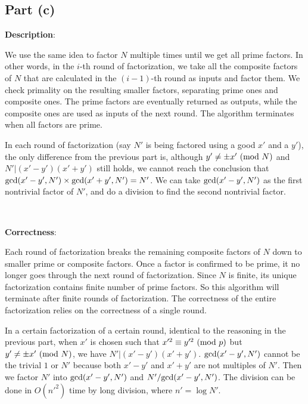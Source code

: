 \documentclass{article}
\begin{document}

\subsection{Part (c)}
\noindent\textbf{Description}:

We use the same idea to factor $N$ multiple times until we get all prime factors. In other words, in the $i$-th round of factorization, we take all the composite factors of $N$ that are calculated in the $(i-1)$-th round as inputs and factor them. We check primality on the resulting smaller factors, separating prime ones and composite ones. The prime factors are eventually returned as outputs, while the composite ones are used as inputs of the next round. The algorithm terminates when all factors are prime.

In each round of factorization (say $N'$ is being factored using a good $x'$ and a $y'$), the only difference from the previous part is, although $y'\neq\pm x'\textup{ (mod }N)$ and $N'|(x'-y')(x'+y')$ still holds, we cannot reach the conclusion that $\textup{gcd}(x'-y',N')\times\textup{gcd}(x'+y',N')=N'$. We can take $\textup{gcd}(x'-y',N')$ as the first nontrivial factor of $N'$, and do a division to find the second nontrivial factor.

~

\noindent\textbf{Correctness}:

Each round of factorization breaks the remaining composite factors of $N$ down to smaller prime or composite factors. Once a factor is confirmed to be prime, it no longer goes through the next round of factorization. Since $N$ is finite, its unique factorization contains finite number of prime factors. So this algorithm will terminate after finite rounds of factorization. The correctness of the entire factorization relies on the correctness of a single round.

In a certain factorization of a certain round, identical to the reasoning in the previous part, when $x'$ is chosen such that $x'^2\equiv y'^2\textup{ (mod }p)$ but $y'\neq\pm x'\textup{ (mod }N)$, we have $N'|(x'-y')(x'+y')$. $\textup{gcd}(x'-y',N')$ cannot be the trivial $1$ or $N'$ because both $x'-y'$ and $x'+y'$ are not multiples of $N'$. Then we factor $N'$ into $\textup{gcd}(x'-y',N')$ and $N'/\textup{gcd}(x'-y',N')$. The division can be done in $O(n'^2)$ time by long division, where $n'=\log N'$.
\end{document}
